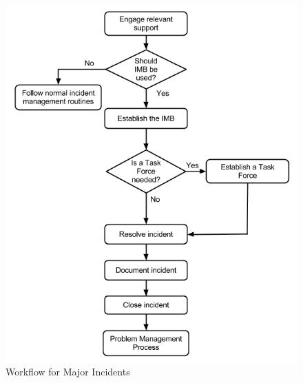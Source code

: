 \begin{figure}[H]
\begin{center}
\includegraphics[scale=0.58]{WorkflowcaseCMAJOR.png}
\caption[Workflow for Major Incidents, Case C]{Workflow for Major Incidents}
\label{fig:workflowcaseCmajor}
\end{center}
\end{figure}

